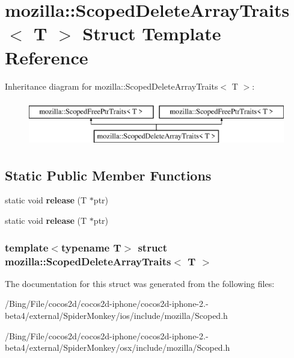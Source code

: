 \hypertarget{structmozilla_1_1_scoped_delete_array_traits}{\section{mozilla\-:\-:Scoped\-Delete\-Array\-Traits$<$ T $>$ Struct Template Reference}
\label{structmozilla_1_1_scoped_delete_array_traits}
}
Inheritance diagram for mozilla\-:\-:Scoped\-Delete\-Array\-Traits$<$ T $>$\-:\begin{figure}[H]
\begin{center}
\leavevmode
\includegraphics[height=2.000000cm]{structmozilla_1_1_scoped_delete_array_traits}
\end{center}
\end{figure}
\subsection*{Static Public Member Functions}
\begin{DoxyCompactItemize}
\item 
\hypertarget{structmozilla_1_1_scoped_delete_array_traits_ab40b46bec1ae258d39c58dbb291cd1c8}{static void {\bfseries release} (T $\ast$ptr)}\label{structmozilla_1_1_scoped_delete_array_traits_ab40b46bec1ae258d39c58dbb291cd1c8}

\item 
\hypertarget{structmozilla_1_1_scoped_delete_array_traits_ab40b46bec1ae258d39c58dbb291cd1c8}{static void {\bfseries release} (T $\ast$ptr)}\label{structmozilla_1_1_scoped_delete_array_traits_ab40b46bec1ae258d39c58dbb291cd1c8}

\end{DoxyCompactItemize}
\subsubsection*{template$<$typename T$>$ struct mozilla\-::\-Scoped\-Delete\-Array\-Traits$<$ T $>$}



The documentation for this struct was generated from the following files\-:\begin{DoxyCompactItemize}
\item 
/\-Bing/\-File/cocos2d/cocos2d-\/iphone/cocos2d-\/iphone-\/2.-\/beta4/external/\-Spider\-Monkey/ios/include/mozilla/Scoped.\-h\item 
/\-Bing/\-File/cocos2d/cocos2d-\/iphone/cocos2d-\/iphone-\/2.-\/beta4/external/\-Spider\-Monkey/osx/include/mozilla/Scoped.\-h\end{DoxyCompactItemize}
